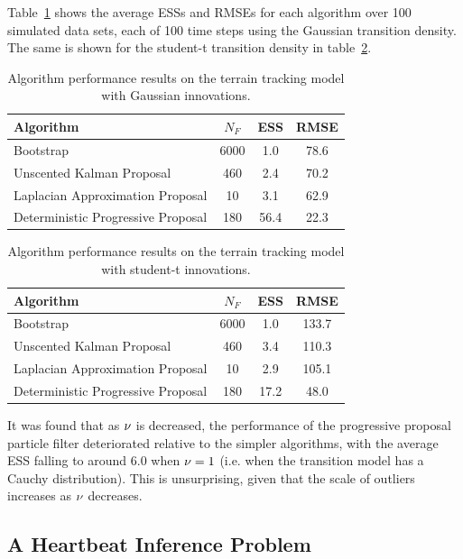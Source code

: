 \documentclass{article}
\begin{document}
Table~\ref{tab:drone_results_gaussian} shows the average ESSs and RMSEs for each algorithm over 100 simulated data sets, each of 100 time steps using the Gaussian transition density. The same is shown for the student-t transition density in table~\ref{tab:drone_results_studentt}.
%
\begin{table}
\centering
\begin{tabular}{l||c|c|c}
Algorithm                                & $N_F$ & ESS  & RMSE \\
\hline
Bootstrap                                &  6000 &  1.0 & 78.6 \\
Unscented Kalman Proposal                &   460 &  2.4 & 70.2 \\
Laplacian Approximation Proposal         &    10 &  3.1 & 62.9 \\
Deterministic Progressive Proposal       &   180 & 56.4 & 22.3 \\
\end{tabular}
\caption{Algorithm performance results on the terrain tracking model with Gaussian innovations.}
\label{tab:drone_results_gaussian}
\end{table}
%
\begin{table}
\centering
\begin{tabular}{l||c|c|c}
Algorithm                                & $N_F$ & ESS  & RMSE \\
\hline
Bootstrap                                &  6000 &  1.0 & 133.7 \\
Unscented Kalman Proposal                &   460 &  3.4 & 110.3 \\
Laplacian Approximation Proposal         &    10 &  2.9 & 105.1 \\
Deterministic Progressive Proposal       &   180 & 17.2 & 48.0 \\
\end{tabular}
\caption{Algorithm performance results on the terrain tracking model with student-t innovations.}
\label{tab:drone_results_studentt}
\end{table}

It was found that as $\nu$ is decreased, the performance of the progressive proposal particle filter deteriorated relative to the simpler algorithms, with the average ESS falling to around $6.0$ when $\nu=1$ (i.e. when the transition model has a Cauchy distribution). This is unsurprising, given that the scale of outliers increases as $\nu$ decreases.



\subsection{A Heartbeat Inference Problem}
\end{document}
